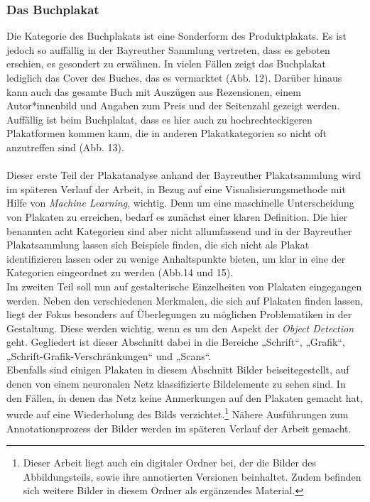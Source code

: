 \documentclass[a4paper,12pt,ngerman]{article}
\begin{document}
\subsubsection{Das Buchplakat}
Die Kategorie des Buchplakats ist eine Sonderform des Produktplakats. Es ist jedoch so auffällig in der Bayreuther Sammlung vertreten, dass es geboten erschien, es gesondert zu erwähnen. In vielen Fällen zeigt das Buchplakat lediglich das Cover des Buches, das es vermarktet (Abb. 12). Darüber hinaus kann auch das gesamte Buch mit Auszügen aus Rezensionen, einem Autor*innenbild und Angaben zum Preis und der Seitenzahl gezeigt werden. Auffällig ist beim Buchplakat, dass es hier auch zu hochrechteckigeren Plakatformen kommen kann, die in anderen Plakatkategorien so nicht oft anzutreffen sind (Abb. 13). \\
\\
Dieser erste Teil der Plakatanalyse anhand der Bayreuther Plakatsammlung wird im späteren Verlauf der Arbeit, in Bezug auf eine Visualisierungsmethode mit Hilfe von \textit{Machine Learning}, wichtig. Denn um eine maschinelle Unterscheidung von Plakaten zu erreichen, bedarf es zunächst einer klaren Definition. Die hier benannten acht Kategorien sind aber nicht allumfassend und in der Bayreuther Plakatsammlung lassen sich Beispiele finden, die sich nicht als Plakat identifizieren lassen oder zu wenige Anhaltspunkte bieten, um klar in eine der Kategorien eingeordnet zu werden (Abb.14 und 15). \\
Im zweiten Teil soll nun auf gestalterische Einzelheiten von Plakaten eingegangen werden. Neben den verschiedenen Merkmalen, die sich auf Plakaten finden lassen, liegt der Fokus besonders auf Überlegungen zu möglichen Problematiken in der Gestaltung. Diese werden wichtig, wenn es um den Aspekt der \textit{Object Detection} geht. Gegliedert ist dieser Abschnitt dabei in die Bereiche „Schrift“, „Grafik“, „Schrift-Grafik-Verschränkungen“ und „Scans“. \\
Ebenfalls sind einigen Plakaten in diesem Abschnitt Bilder beiseitegestellt, auf denen von einem neuronalen Netz klassifizierte Bildelemente zu sehen sind. In den Fällen, in denen das Netz keine Anmerkungen auf den Plakaten gemacht hat, wurde auf eine Wiederholung des Bilds verzichtet.\footnote{Dieser Arbeit liegt auch ein digitaler Ordner bei, der die Bilder des Abbildungsteils, sowie ihre annotierten Versionen beinhaltet. Zudem befinden sich weitere Bilder in diesem Ordner als ergänzendes Material.}  Nähere Ausführungen zum Annotationsprozess der Bilder werden im späteren Verlauf der Arbeit gemacht. \\
\end{document}
